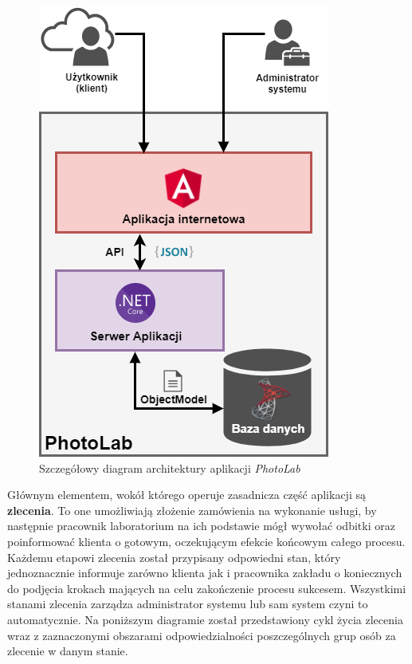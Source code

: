 	
	\begin{figure}[ht]
	\centering
	\includegraphics[width=0.5\linewidth]{graphics/chapter-4/application-architecture.png}
	\caption{Szczegółowy diagram architektury aplikacji \textit{PhotoLab}}
	\label{fig:application-architecture-without-payu}
\end{figure}
	
	
\noindent Głównym elementem, wokół którego operuje zasadnicza część aplikacji są \textbf{zlecenia}. To one umożliwiają złożenie zamówienia na wykonanie usługi, by następnie pracownik laboratorium na ich podstawie mógł wywołać odbitki oraz poinformować klienta o gotowym, oczekującym efekcie końcowym całego procesu. \\
	Każdemu etapowi zlecenia został przypisany odpowiedni stan, który jednoznacznie informuje zarówno klienta jak i pracownika zakładu o koniecznych do podjęcia krokach mających na celu zakończenie procesu sukcesem. Wszystkimi stanami zlecenia zarządza administrator systemu lub sam system czyni to automatycznie. Na poniższym diagramie został przedstawiony cykl życia zlecenia wraz z zaznaczonymi obszarami odpowiedzialności poszczególnych grup osób za zlecenie w danym stanie.
	
